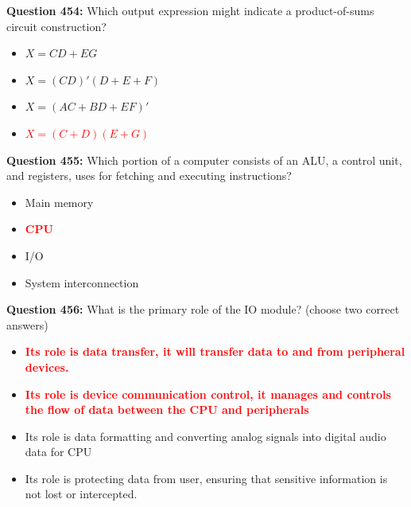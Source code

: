 \documentclass[12pt,a4paper]{article}
\begin{document}
\vspace{0.5cm}

\textbf{Question 454:} Which output expression might indicate a product-of-sums circuit construction?

\begin{itemize}
    \item[\textbf{A.}] $X = CD + EG$
    \item[\textbf{B.}] $X = (CD)'(D + E + F)$
    \item[\textbf{C.}] $X = (AC + BD + EF)'$
    \item[\textbf{D.}] \textcolor{red}{\textbf{$X = (C + D)(E + G)$}}
\end{itemize}

\vspace{0.5cm}

\textbf{Question 455:} Which portion of a computer consists of an ALU, a control unit, and registers, uses for fetching and executing instructions?

\begin{itemize}
    \item[\textbf{A.}] Main memory
    \item[\textbf{B.}] \textcolor{red}{\textbf{CPU}}
    \item[\textbf{C.}] I/O
    \item[\textbf{D.}] System interconnection
\end{itemize}

\vspace{0.5cm}

\textbf{Question 456:} What is the primary role of the IO module? (choose two correct answers)

\begin{itemize}
    \item[\textbf{A.}] \textcolor{red}{\textbf{Its role is data transfer, it will transfer data to and from peripheral devices.}}
    \item[\textbf{B.}] \textcolor{red}{\textbf{Its role is device communication control, it manages and controls the flow of data between the CPU and peripherals}}
    \item[\textbf{C.}] Its role is data formatting and converting analog signals into digital audio data for CPU
    \item[\textbf{D.}] Its role is protecting data from user, ensuring that sensitive information is not lost or intercepted.
\end{itemize}

\vspace{0.5cm}
\end{document}
